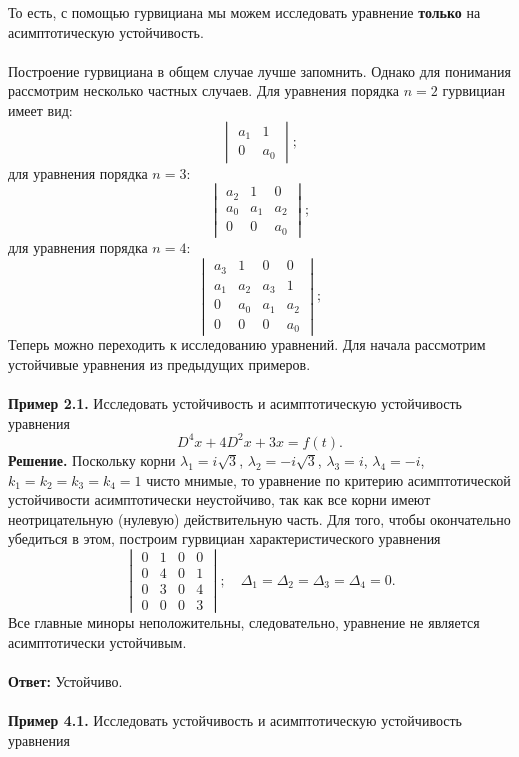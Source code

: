 \documentclass[a4paper, 12pt]{article}
\begin{document}
То есть, с помощью гурвициана мы можем исследовать уравнение \textbf{только} на асимптотическую устойчивость.\\\\
Построение гурвициана в общем случае лучше запомнить. Однако для понимания рассмотрим несколько частных случаев. Для уравнения порядка $n = 2$ гурвициан имеет вид: $$\begin{vmatrix}
	a_1 & 1\\
	0 & a_0
\end{vmatrix};$$
для уравнения порядка $n = 3$:
 $$\begin{vmatrix}
	a_2 & 1 & 0\\
	a_0 & a_1 & a_2\\
	0 & 0 & a_0
\end{vmatrix};$$
для уравнения порядка $n = 4$:
$$\begin{vmatrix}
	a_3 & 1 & 0 & 0\\
	a_1 & a_2 & a_3 & 1\\
	0 & a_0 & a_1 & a_2\\
	0 & 0 & 0 & a_0
\end{vmatrix};$$
Теперь можно переходить к исследованию уравнений. Для начала рассмотрим устойчивые уравнения из предыдущих примеров.\\\\
\textbf{Пример 2.1.} Исследовать устойчивость и асимптотическую устойчивость уравнения
$$D^4x + 4D^2x + 3x = f(t).$$
\textbf{Решение.} Поскольку корни $\lambda_1 = i\sqrt{3}$, $\lambda_2 = -i\sqrt{3}$, $\lambda_3 = i$, $\lambda_4 = -i$, $k_1 = k_2 = k_3 = k_4 = 1$ чисто мнимые, то уравнение по критерию асимптотической устойчивости асимптотически неустойчиво, так как все корни имеют неотрицательную (нулевую) действительную часть. Для того, чтобы окончательно убедиться в этом, построим гурвициан характеристического уравнения $$\begin{vmatrix}
	0 & 1 & 0 & 0\\
	0 & 4 & 0 & 1\\
	0 & 3 & 0 & 4\\
	0 & 0 & 0 & 3
\end{vmatrix};\quad \Delta_1 = \Delta_2 = \Delta_3 = \Delta_4 = 0.$$
Все главные миноры неположительны, следовательно, уравнение не является асимптотически устойчивым.\\\\
\textbf{Ответ:} Устойчиво.\\\\
\textbf{Пример 4.1.} Исследовать устойчивость и асимптотическую устойчивость уравнения
\end{document}
